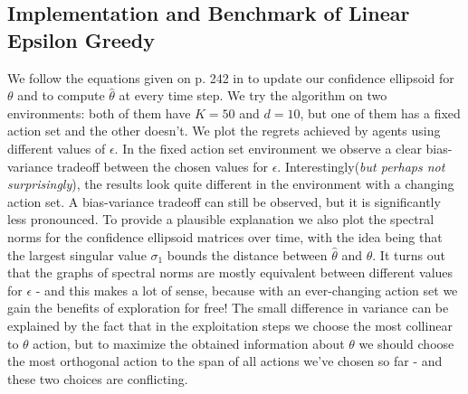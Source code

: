 \subsection{Implementation and Benchmark of Linear Epsilon Greedy}
We follow the equations given on p. 242 in \cite{lattimore2020bandit} to update our confidence ellipsoid for $\theta$
and to compute $\hat{\theta}$ at every time step. We try the algorithm on two environments: both of them have $K=50$ and $d=10$,
but one of them has a fixed action set and the other doesn't. We plot the regrets achieved by agents using different values of $\epsilon$.
In the fixed action set environment we observe a clear bias-variance tradeoff between the chosen values for $\epsilon$. 
Interestingly(\emph{but perhaps not surprisingly}), the results look quite different in the environment with a changing action set. A bias-variance
tradeoff can still be observed, but it is significantly less pronounced. To provide a plausible explanation we also plot the spectral norms for the
confidence ellipsoid matrices over time, with the idea being that the largest singular value $\sigma_1$ bounds the distance between $\hat{\theta}$
and $\theta$. It turns out that the graphs of spectral norms are mostly equivalent between different values for $\epsilon$ - and this makes a lot of sense, 
because with an ever-changing action set we gain the benefits of exploration for free! The small difference in variance can be explained by the fact that
in the exploitation steps we choose the most collinear to $\theta$ action, but to maximize the obtained information about $\theta$ we should choose the most
orthogonal action to the span of all actions we've chosen so far - and these two choices are conflicting.

